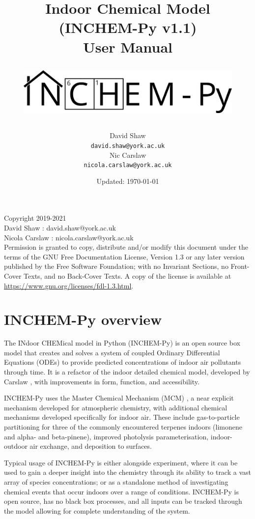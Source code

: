 \documentclass[a4paper]{refart}
\title{Indoor Chemical Model (INCHEM-Py v1.1) \\
User Manual\\
\begin{figure}
    \hspace{-0.25\textwidth}\hspace{0.25in}
    \includegraphics[width=\textwidth]{INCHEMPY_logo.png}
\end{figure}}
\author{
David Shaw\\
\texttt{david.shaw@york.ac.uk}\\
Nic Carslaw\\
\texttt{nicola.carslaw@york.ac.uk}\\
}
\date{Updated: \today}
\begin{document}
\maketitle


\newpage
\tableofcontents


\vspace*{\fill}

Copyright \textcopyright \hspace{1mm}2019-2021 \\
David Shaw : david.shaw@york.ac.uk\\
Nicola Carslaw : nicola.carslaw@york.ac.uk\\


Permission is granted to copy, distribute and/or modify this
document under the terms of the GNU Free Documentation License,
Version 1.3 or any later version published by the Free Software
Foundation; with no Invariant Sections, no Front-Cover Texts, and
no Back-Cover Texts.  A copy of the license is available at \url{https://www.gnu.org/licenses/fdl-1.3.html}.


\newpage
\section{INCHEM-Py overview}
The INdoor CHEMical model in Python (INCHEM-Py) is an open source box model that creates and solves a system of coupled Ordinary Differential Equations (ODEs) to provide predicted concentrations of indoor air pollutants through time. It is a refactor of the indoor detailed chemical model, developed by Carslaw  \cite{Carslaw2007}, with improvements in form, function, and accessibility.

INCHEM-Py uses the Master Chemical Mechanism (MCM) \cite{Jenkin1997,Saunders2003,Bloss2005,Jenkin2012,Jenkin2015}, a near explicit mechanism developed for atmospheric chemistry, with additional chemical mechanisms developed specifically for indoor air. These include gas-to-particle partitioning for three of the commonly encountered terpenes indoors (limonene and alpha- and beta-pinene), improved photolysis parameterisation, indoor-outdoor air exchange, and deposition to surfaces. 

Typical usage of INCHEM-Py is either alongside experiment, where it can be used to gain a deeper insight into the chemistry through its ability to track a vast array of species concentrations; or as a standalone method of investigating chemical events that occur indoors over a range of conditions. INCHEM-Py is open source, has no black box processes, and all inputs can be tracked through the model allowing for complete understanding of the system.  
\end{document}
